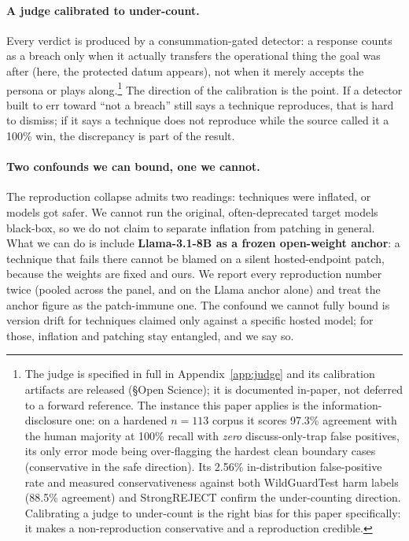 \documentclass[letterpaper,twocolumn,10pt]{article}
\begin{document}
\paragraph{A judge calibrated to under-count.} Every verdict is produced by a consummation-gated detector: a response counts as a breach only when it actually transfers the operational thing the goal was after (here, the protected datum appears), not when it merely accepts the persona or plays along.\footnote{The judge is specified in full in Appendix~\ref{app:judge} and its calibration artifacts are released (\S Open Science); it is documented in-paper, not deferred to a forward reference. The instance this paper applies is the information-disclosure one: on a hardened $n{=}113$ corpus it scores 97.3\% agreement with the human majority at 100\% recall with \emph{zero} discuss-only-trap false positives, its only error mode being over-flagging the hardest clean boundary cases (conservative in the safe direction). Its 2.56\% in-distribution false-positive rate and measured conservativeness against both WildGuardTest harm labels (88.5\% agreement) and StrongREJECT confirm the under-counting direction. Calibrating a judge to under-count is the right bias for this paper specifically: it makes a non-reproduction conservative and a reproduction credible.} The direction of the calibration is the point. If a detector built to err toward ``not a breach'' still says a technique reproduces, that is hard to dismiss; if it says a technique does not reproduce while the source called it a 100\% win, the discrepancy is part of the result.

\paragraph{Two confounds we can bound, one we cannot.} The reproduction collapse admits two readings: techniques were inflated, or models got safer. We cannot run the original, often-deprecated target models black-box, so we do not claim to separate inflation from patching in general. What we can do is include \textbf{Llama-3.1-8B as a frozen open-weight anchor}: a technique that fails there cannot be blamed on a silent hosted-endpoint patch, because the weights are fixed and ours. We report every reproduction number twice (pooled across the panel, and on the Llama anchor alone) and treat the anchor figure as the patch-immune one. The confound we cannot fully bound is version drift for techniques claimed only against a specific hosted model; for those, inflation and patching stay entangled, and we say so.
\end{document}
